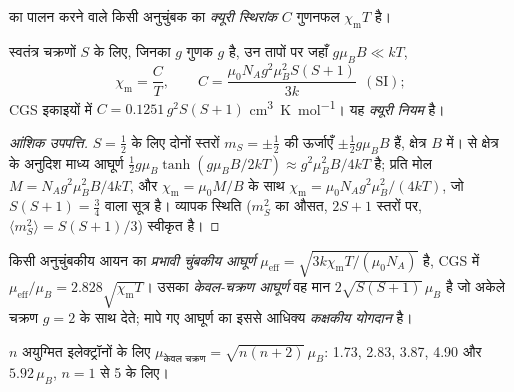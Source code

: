 \begin{definition}[क्यूरी स्थिरांक]\label{def:b3:complex-spectra-magnetism:curie}
 का पालन करने वाले किसी अनुचुंबक का \emph{क्यूरी स्थिरांक} $C$
गुणनफल $\chi_{\mathrm m}T$ है।
\end{definition}

\begin{theorem}[क्यूरी नियम]\label{thm:b3:complex-spectra-magnetism:curie}
स्वतंत्र चक्रणों $S$ के लिए, जिनका $g$ गुणक $g$ है, उन तापों पर जहाँ $g\mu_BB \ll kT$,
\[
  \chi_{\mathrm m} = \frac{C}{T}, \qquad C = \frac{\mu_0N_Ag^2\mu_B^2S(S+1)}{3k}\ \ (\text{SI});
\]
CGS इकाइयों में $C = 0.1251\,g^2S(S+1)$ \unit{cm^3.K.mol^{-1}}। यह \emph{क्यूरी नियम} है।
\end{theorem}

\begin{proof}[आंशिक उपपत्ति]
$S = \frac12$ के लिए दोनों स्तरों $m_S = \pm\frac12$ की ऊर्जाएँ $\pm\frac12g\mu_BB$ हैं, क्षेत्र $B$ में।
 से क्षेत्र के अनुदिश माध्य आघूर्ण $\frac12g\mu_B\tanh(g\mu_BB/2kT) \approx
g^2\mu_B^2B/4kT$ है; प्रति मोल $M = N_Ag^2\mu_B^2B/4kT$, और $\chi_{\mathrm m} = \mu_0M/B$ के साथ $\chi_{\mathrm m} = \mu_0N_Ag^2\mu_B^2/(4kT)$,
जो $S(S+1) = \frac34$ वाला सूत्र है। व्यापक स्थिति ($m_S^2$ का औसत, $2S + 1$
स्तरों पर, $\langle m_S^2\rangle = S(S+1)/3$) स्वीकृत है।
\end{proof}

\begin{definition}[प्रभावी चुंबकीय आघूर्ण]\label{def:b3:complex-spectra-magnetism:moment}
किसी अनुचुंबकीय आयन का \emph{प्रभावी चुंबकीय आघूर्ण}
$\mu_{\mathrm{eff}} = \sqrt{3k\chi_{\mathrm m}T/(\mu_0N_A)}$ है, CGS में $\mu_{\mathrm{eff}}/\mu_B = 2.828\sqrt{\chi_{\mathrm m}T}$। उसका
\emph{केवल-चक्रण आघूर्ण} वह मान $2\sqrt{S(S+1)}\,\mu_B$ है जो
अकेले चक्रण $g = 2$ के साथ देते; मापे गए आघूर्ण का इससे आधिक्य
\emph{कक्षकीय योगदान} है।
\end{definition}

\begin{proposition}[केवल-चक्रण सूत्र]\label{prop:b3:complex-spectra-magnetism:spin-only}
$n$ अयुग्मित इलेक्ट्रॉनों के लिए $\mu_{\text{केवल चक्रण}} = \sqrt{n(n+2)}\,\mu_B$: 1.73, 2.83, 3.87, 4.90 और $5.92\,\mu_B$,
$n = 1$ से 5 के लिए।
\end{proposition}


